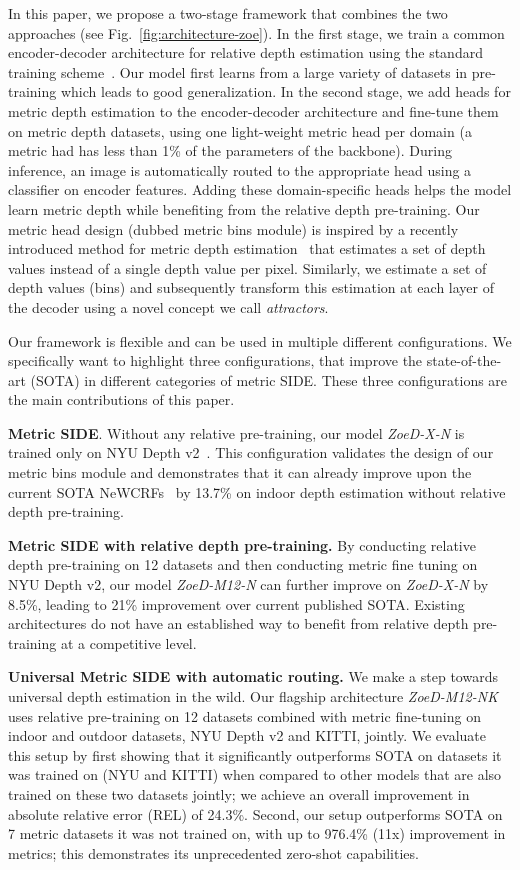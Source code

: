 \documentclass[10pt,twocolumn,letterpaper]{article}
\begin{document}
In this paper, we propose a two-stage framework that combines the two approaches (see Fig.~\ref{fig:architecture-zoe}). In the first stage, we train a common encoder-decoder architecture for relative depth estimation using the standard training scheme~\cite{Ranftl_2021_ICCV_DPT}. Our model first learns from a large variety of datasets in pre-training which leads to good generalization. In the second stage, we add heads for metric depth estimation to the encoder-decoder architecture and fine-tune them on metric depth datasets, using one light-weight metric head per domain (a metric had has less than 1\% of the parameters of the backbone).
During inference, an image is automatically routed to the appropriate head using a classifier on encoder features.
Adding these domain-specific heads helps the model learn metric depth while benefiting from the relative depth pre-training.
Our metric head design (dubbed metric bins module) is inspired by a recently introduced method for metric depth estimation~\cite{bhat2022localbins} that estimates a set of depth values instead of a single depth value per pixel. Similarly, we estimate a set of depth values (bins) and subsequently transform this estimation at each layer of the decoder using a novel concept we call \textit{attractors}.

Our framework is flexible and can be used in multiple different configurations. We specifically want to highlight three configurations, that improve the state-of-the-art (SOTA) in different categories of metric SIDE. These three configurations are the main contributions of this paper.

\textbf{Metric SIDE}. Without any relative pre-training, our model \textit{ZoeD-X-N} is trained only on NYU Depth v2~\cite{Silberman2012}. This configuration validates the design of our metric bins module and demonstrates that it can already improve upon the current SOTA NeWCRFs~\cite{yuan2022new} by 13.7\% on indoor depth estimation without relative depth pre-training.

\textbf{Metric SIDE with relative depth pre-training.} By conducting relative depth pre-training on 12 datasets and then conducting metric fine tuning on NYU Depth v2, our model \textit{ZoeD-M12-N} can further improve on \textit{ZoeD-X-N} by 8.5\%, leading to 21\% improvement over current published SOTA. Existing architectures do not have an established way to benefit from relative depth pre-training at a competitive level.

\textbf{Universal Metric SIDE with automatic routing.} We make a step towards universal depth estimation in the wild. Our flagship architecture \textit{ZoeD-M12-NK} uses relative pre-training on 12 datasets combined with metric fine-tuning on indoor and outdoor datasets, \ie NYU Depth v2 and KITTI, jointly. 
We evaluate this setup by first showing that it significantly outperforms SOTA on datasets it was trained on (NYU and KITTI) when compared to other models that are also trained on these two datasets jointly; we achieve an overall improvement in absolute relative error (REL) of 24.3\%. Second, our setup outperforms SOTA on 7 metric datasets it was not trained on, with up to 976.4\% (11x) improvement in metrics; this demonstrates its unprecedented zero-shot capabilities.
\end{document}
